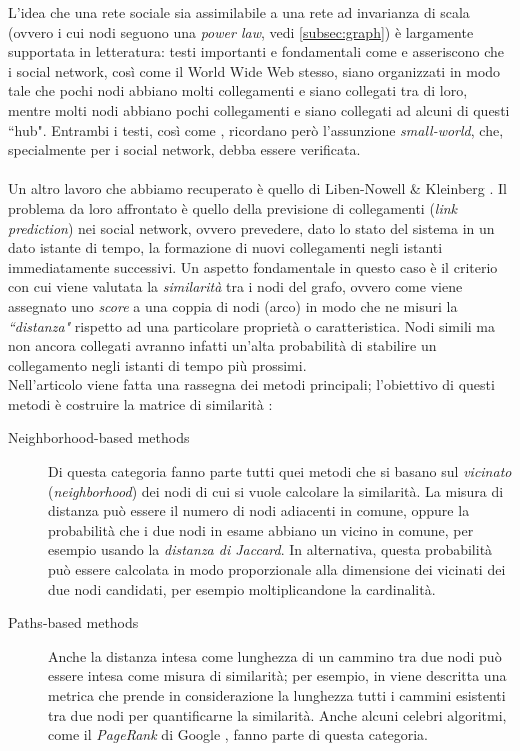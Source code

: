 \documentclass[a4paper,12pt]{article}
\begin{document}
L'idea che una rete sociale sia assimilabile a una rete ad invarianza di scala (ovvero i cui nodi seguono una \textit{power law}, vedi \ref{subsec:graph}) è largamente supportata in letteratura: testi importanti e fondamentali come \cite{barabasi} e \cite{newman} asseriscono che i social network, così come il World Wide Web stesso, siano organizzati in modo tale che pochi nodi abbiano molti collegamenti e siano collegati tra di loro, mentre molti nodi abbiano pochi collegamenti e siano collegati ad alcuni di questi ``hub". Entrambi i testi, così come \cite{gilbert}, ricordano però l'assunzione \textit{small-world}, che, specialmente per i social network, debba essere verificata. 
\\
\\
Un altro lavoro che abbiamo recuperato è quello di Liben-Nowell \& Kleinberg \cite{link}. Il problema da loro affrontato è quello della previsione di collegamenti (\textit{link prediction}) nei social network, ovvero prevedere, dato lo stato del sistema in un dato istante di tempo, la formazione di nuovi collegamenti negli istanti immediatamente successivi. Un aspetto fondamentale in questo caso è il criterio con cui viene valutata la \textit{similarità} tra i nodi del grafo, ovvero come viene assegnato uno \textit{score} a una coppia di nodi (arco) in modo che ne misuri la \textit{``distanza"} rispetto ad una particolare proprietà o caratteristica. Nodi simili ma non ancora collegati avranno infatti un'alta probabilità di stabilire un collegamento negli istanti di tempo più prossimi. \\
Nell'articolo viene fatta una rassegna dei metodi principali; l'obiettivo di questi metodi è costruire la matrice di similarità :
\begin{description}
\item[Neighborhood-based methods] Di questa categoria fanno parte tutti quei metodi che si basano sul \textit{vicinato} (\textit{neighborhood}) dei nodi di cui si vuole calcolare la similarità. La misura di distanza può essere il numero di nodi adiacenti in comune, oppure la probabilità che i due nodi in esame abbiano un vicino in comune, per esempio usando la \textit{distanza di Jaccard}. In alternativa, questa probabilità può essere calcolata in modo proporzionale alla dimensione dei vicinati dei due nodi candidati, per esempio moltiplicandone la cardinalità.
\item[Paths-based methods] Anche la distanza intesa come lunghezza di un cammino tra due nodi può essere intesa come misura di similarità; per esempio, in \cite{katz} viene descritta una metrica che prende in considerazione la lunghezza tutti i cammini esistenti tra due nodi per quantificarne la similarità. Anche alcuni celebri algoritmi, come il \textit{PageRank} di Google \cite{google}, fanno parte di questa categoria.
\end{description}
\end{document}
